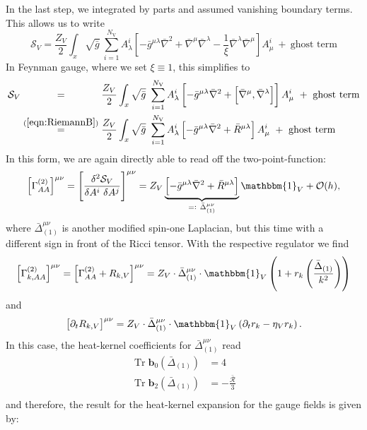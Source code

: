 In the last step, we integrated by parts and assumed vanishing boundary terms.\\
 This allows us to write 
\begin{equation}
\mathcal{S}_V = \frac{Z_{V}}{2} \int_x \sqrt{\bar{g}} \ \sum\limits_{i=1}^{N_{\text{V}}} A_{\lambda}^{i}\left[ - \bar{g}^{\mu\lambda}\bar{\nabla}^2 +  \bar{\nabla}^{\mu}\bar{\nabla}^{\lambda} - \frac{1}{\xi} \bar{\nabla}^{\lambda}\bar{\nabla}^{\mu}\right]A_{\mu}^{i} \ + \ \text{ghost term}
\end{equation}
In Feynman gauge, where we set $\xi \equiv 1$, this simplifies to
\begin{equation}
\begin{aligned}
\mathcal{S}_V &\overset{\phantom{(\mathrm{\ref{eqn:RiemannB}})}}{=} \frac{Z_{V}}{2} \int_x \sqrt{\bar{g}} \ \sum\limits_{i=1}^{N_{\text{V}}} A_{\lambda}^{i}\left[ - \bar{g}^{\mu\lambda}\bar{\nabla}^2 +  \left[\bar{\nabla}^{\mu}, \bar{\nabla}^{\lambda}\right]\right]A_{\mu}^{i} \ + \ \text{ghost term} \\
&\overset{(\mathrm{\ref{eqn:RiemannB}})}{=} \frac{Z_{V}}{2} \int_x \sqrt{\bar{g}} \ \sum\limits_{i=1}^{N_{\text{V}}} A_{\lambda}^{i}\left[ - \bar{g}^{\mu\lambda}\bar{\nabla}^2 +  \bar{R}^{\mu\lambda}\right]A_{\mu}^{i} \ + \ \text{ghost term}
\end{aligned}
\end{equation}
In this form, we are again directly able to read off the two-point-function:
\begin{equation}
	\left[\Gamma^{(2)}_{AA}\right]^{\mu\nu} = \left[\frac{\delta^2 \mathcal{S}_V}{\delta A^{i}\ \delta A^{j}}\right]^{\mu\nu} = Z_V\underbrace{\left[ - \bar{g}^{\mu\lambda}\bar{\nabla}^2 +  \bar{R}^{\mu\lambda}\right]}_{=: \  \bar{\Delta}^{\mu\nu}_{(1)}}\mathbbm{1}_V + \mathcal{O}(h),
\end{equation} 
where $\bar{\Delta}^{\mu\nu}_{(1)}$ is another modified spin-one Laplacian, but this time with a different sign in front of the Ricci tensor.  With the respective regulator we find
\begin{align}
	\left[\Gamma^{(2)}_{k, AA}\right]^{\mu\nu} = \left[\Gamma^{(2)}_{AA}+ R_{k, V}\right]^{\mu\nu}  = Z_V \cdot\bar{\Delta}_{(1)}^{\mu\nu}\cdot\mathbbm{1}_V\left(1 + r_k\left(\frac{\bar{\Delta}_{(1)}}{k^2}\right)\right)
\end{align}
and 
\begin{align}
	\left[\partial_t R_{k, V}\right]^{\mu\nu} = Z_V\cdot\bar{\Delta}_{(1)}^{\mu\nu}\cdot\mathbbm{1}_V\left(\partial_t r_k - \eta_V r_k\right).
\end{align}
In this case, the heat-kernel coefficients for $\bar{\Delta}^{\mu\nu}_{(1)}$ read
\begin{equation}
\begin{aligned}
	\operatorname{Tr}\mathbf{b}_0\left(\bar{\Delta}_{(1)}\right) &= 4 \\
	\operatorname{Tr}\mathbf{b}_2\left(\bar{\Delta}_{(1)}\right) &= -\frac{\bar{\mathcal{R}}}{3} \\
\end{aligned} 
\end{equation}
and therefore, the result for the heat-kernel expansion for the gauge fields is given by:

